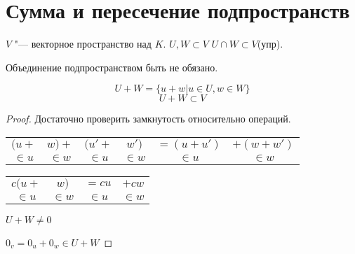 \section{Сумма и пересечение подпространств}
\begin{theorem}
$V$ "--- векторное пространство над $K$.
$U, W \subset V$
$U \cap W \subset V$(упр).

Объединение подпространством быть не обязано.

$$U + W = \{u + w| u \in U, w \in W\}$$
$$U + W \subset V$$
\end{theorem}

\begin{proof}
Достаточно проверить замкнутость относительно операций. 

\begin{tabular}{cccccc}
$(u+$&$w)+$&$(u'+$&$w')$&$=(u + u')$&$+(w + w')$\\
$\in u$&$\in w$&$\in u$&$\in w$ &$\in u$&$\in w$\\
\end{tabular}


\begin{tabular}{cccc}
$c(u+$&$w)$&$=cu$&$+cw$\\
$\in u$&$\in w$&$\in u$&$\in w$\\
\end{tabular}

$U + W \ne 0$

$0_v = 0_{u} + 0_{w} \in U + W$
\end{proof}

